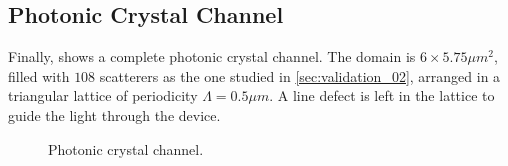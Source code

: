 \subsection{Photonic Crystal Channel} \label{sec:validation_03}

Finally,  shows a complete photonic crystal
channel. The domain is $6 \times 5.75 \mu m^2$, filled with $108$
scatterers as the one studied in \ref{sec:validation_02}, arranged in
a triangular lattice of periodicity $\Lambda = 0.5 \mu m$. A line
defect is left in the lattice to guide the light through the device.

\begin{figure}[htbp]
  \begin{center}
  \end{center}
  \caption{Photonic crystal channel.}
  \label{fig:validation_03}
\end{figure}  

